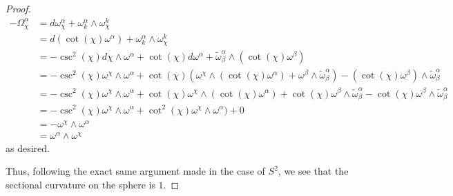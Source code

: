 \documentclass[fontsize=11pt]{scrartcl} %
\numberwithin{equation}{section} %
\numberwithin{figure}{section} %
\numberwithin{table}{section} %
\begin{document}
\begin{proof}
    \[
        \begin{aligned}
            -\Omega^{\alpha}_{\chi} &= d\omega^{\alpha}_{\chi} +
            \omega^{\alpha}_k\wedge\omega^k_{\chi}\\
            &= d(\cot(\chi)\omega^{\alpha}) +
            \omega^{\alpha}_k\wedge\omega^k_{\chi}\\
            &= -\csc^2(\chi)d\chi\wedge\omega^{\alpha} +
            \cot(\chi)d\omega^{\alpha} +
            \tilde{\omega}^{\alpha}_{\beta}\wedge(\cot(\chi)\omega^{\beta})\\
            &= -\csc^2(\chi)\omega^{\chi}\wedge\omega^{\alpha} +
            \cot(\chi)(\omega^{\chi}\wedge(\cot(\chi)\omega^{\alpha}) +
                \omega^{\beta}\wedge\tilde{\omega}^{\alpha}_{\beta}) -
            (\cot(\chi)\omega^{\beta})\wedge\tilde{\omega}^{\alpha}_{\beta}\\
            &= -\csc^2(\chi)\omega^{\chi}\wedge\omega^{\alpha} +
            \cot(\chi)\omega^{\chi}\wedge(\cot(\chi)\omega^{\alpha}) +
            \cot(\chi)\omega^{\beta}\wedge\tilde{\omega}^{\alpha}_{\beta} -
            \cot(\chi)\omega^{\beta}\wedge\tilde{\omega}^{\alpha}_{\beta}\\
            &= -\csc^2(\chi)\omega^{\chi}\wedge\omega^{\alpha} +
            \cot^2(\chi)\omega^{\chi}\wedge\omega^{\alpha})+
            0\\
            &= -\omega^{\chi}\wedge\omega^{\alpha}\\
            &=\omega^{\alpha}\wedge\omega^{\chi}
        \end{aligned}
    \]
    as desired.

    Thus, following the exact same argument made in the case of $S^2$, we see
    that the sectional curvature on the sphere is $1$.
\end{proof}

\newpage
\end{document}
